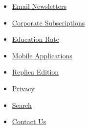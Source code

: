 \begin{itemize}
\tightlist
\item
  \href{http://www.nytimes3xbfgragh.onion/marketing/newsletters}{Email
  Newsletters}
\item
  \href{http://www.nytimes3xbfgragh.onion/corporateleftnav}{Corporate
  Subscriptions}
\item
  \href{http://www.nytimes3xbfgragh.onion/educationleftnav}{Education
  Rate}
\end{itemize}

\begin{itemize}
\tightlist
\item
  \href{http://www.nytimes3xbfgragh.onion/services/mobile/index.html}{Mobile
  Applications}
\item
  \href{http://eedition.nytimes3xbfgragh.onion/cgi-bin/signup.cgi?cc=37FYY}{Replica
  Edition}
\end{itemize}

\begin{itemize}
\tightlist
\item
  \href{http://www.nytimes3xbfgragh.onion/privacy}{Privacy}
\item
  \href{http://www.nytimes3xbfgragh.onion/search}{Search}
\item
  \href{http://www.nytimes3xbfgragh.onion/ref/membercenter/help/infoservdirectory.html}{Contact
  Us}
\end{itemize}
